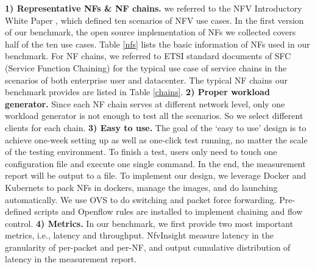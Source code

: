 
\textbf{1) Representative NFs \& NF chains.}
we referred to the NFV Introductory White Paper \cite{},
which defined ten scenarios of NFV use cases.
In the first version of our benchmark,
the open source implementation of NFs we collected
covers half of the ten use cases.
Table \ref{nfs} lists the basic information of NFs used in our benchmark.
For NF chains, we referred to ETSI standard documents of SFC
(Service Function Chaining) \cite{draft-ietf-sfc-dc-use-cases-06}
for the typical use case of service chains
in the scenarios of both enterprise user and datacenter.
The typical NF chains our benchmark provides are listed in Table \ref{chains}.
\textbf{2) Proper workload generator.}
Since each NF chain serves at different network level,
only one workload generator is not enough to test all the scenarios.
So we select different clients for each chain.
\textbf{3) Easy to use.}
The goal of the `easy to use' design is to
achieve one-week setting up as well as one-click test running,
no matter the scale of the testing environment.
To finish a test, users only need to touch one configuration file
and execute one single command.
In the end, the measurement report will be output to a file.
To implement our design,
we leverage Docker and Kubernets to pack NFs in dockers,
manage the images, and do launching automatically.
We use OVS to do switching and packet force forwarding.
Pre-defined scripts and Openflow rules are installed
to implement chaining and flow control.
\textbf{4) Metrics.}
In our benchmark, we first provide two most important metrics, i.e., latency and throughput.
NfvInsight measure latency in the granularity of per-packet and per-NF,
and output cumulative distribution of latency in the measurement report.

